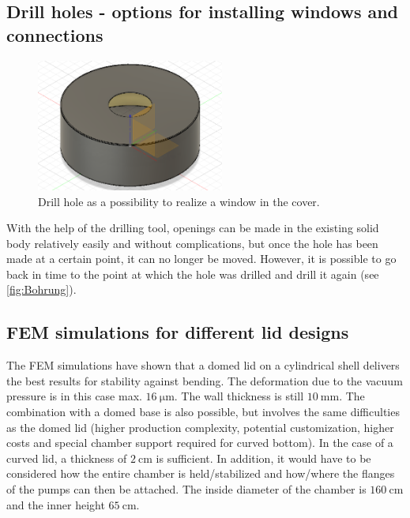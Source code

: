 \subsection{Drill holes - options for installing windows and connections}

\begin{figure}[h]
    \centering
    \includegraphics[width=0.55\textwidth]{sections/imges/vacuum_vessel/Bohrung.PNG}
    \caption{Drill hole as a possibility to realize a window in the cover.}
    \label{fig:Bohrung}
\end{figure}

With the help of the drilling tool, openings can be made in the existing solid body relatively easily and without complications, but once the hole has been made at a certain point, it can no longer be moved.
However, it is possible to go back in time to the point at which the hole was drilled and drill it again (see \autoref{fig:Bohrung}).

\subsection{FEM simulations for different lid designs}

The FEM simulations have shown that a domed lid on a cylindrical shell delivers the best results for stability against bending.
The deformation due to the vacuum pressure is in this case max. $16\ \si{\micro\meter}$.
The wall thickness is still $10\ \si{\milli\meter}$.
The combination with a domed base is also possible, but involves the same difficulties as the domed lid (higher production complexity, potential customization, higher costs and special chamber support required for curved bottom).
In the case of a curved lid, a thickness of $2\ \si{\centi\meter}$ is sufficient.
In addition, it would have to be considered how the entire chamber is held/stabilized and how/where the flanges of the pumps can then be attached.
The inside diameter of the chamber is $160\ \si{\centi\meter}$ and the inner height $65\ \si{\centi\meter}$.

